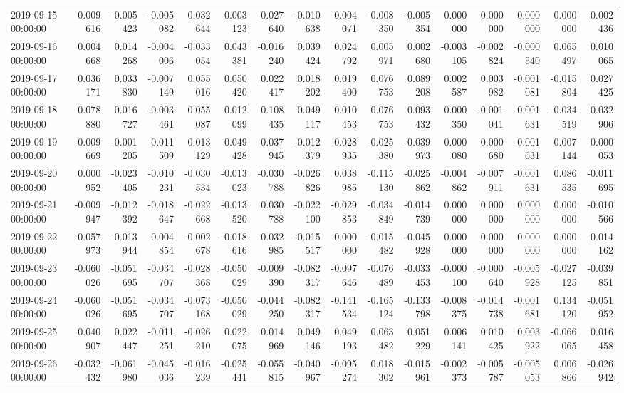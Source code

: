 \begin{tabular}{lrrrrrrrrrrrrrrr}
2019-09-15 00:00:00 & 0.009616 & -0.005423 & -0.005082 & 0.032644 & 0.003123 & 0.027640 & -0.010638 & -0.004071 & -0.008350 & -0.005354 & 0.000000 & 0.000000 & 0.000000 & 0.000000 & 0.002436 \\
2019-09-16 00:00:00 & 0.004668 & 0.014268 & -0.004006 & -0.033054 & 0.043381 & -0.016240 & 0.039424 & 0.024792 & 0.005971 & 0.002680 & -0.003105 & -0.002824 & -0.000540 & 0.065497 & 0.010065 \\
2019-09-17 00:00:00 & 0.036171 & 0.033830 & -0.007149 & 0.055016 & 0.050420 & 0.022417 & 0.018202 & 0.019400 & 0.076753 & 0.089208 & 0.002587 & 0.003982 & -0.001081 & -0.015804 & 0.027425 \\
2019-09-18 00:00:00 & 0.078880 & 0.016727 & -0.003461 & 0.055087 & 0.012099 & 0.108435 & 0.049117 & 0.010453 & 0.076753 & 0.093432 & 0.000350 & -0.001041 & -0.001631 & -0.034519 & 0.032906 \\
2019-09-19 00:00:00 & -0.009669 & -0.001205 & 0.011509 & 0.013129 & 0.049428 & 0.037945 & -0.012379 & -0.028935 & -0.025380 & -0.039973 & 0.000080 & 0.000680 & -0.001631 & 0.007144 & 0.000053 \\
2019-09-20 00:00:00 & 0.000952 & -0.023405 & -0.010231 & -0.030534 & -0.013023 & -0.030788 & -0.026826 & 0.038985 & -0.115130 & -0.025862 & -0.004862 & -0.007911 & -0.001631 & 0.086535 & -0.011695 \\
2019-09-21 00:00:00 & -0.009947 & -0.012392 & -0.018647 & -0.022668 & -0.013520 & 0.030788 & -0.022100 & -0.029853 & -0.034849 & -0.014739 & 0.000000 & 0.000000 & 0.000000 & 0.000000 & -0.010566 \\
2019-09-22 00:00:00 & -0.057973 & -0.013944 & 0.004854 & -0.002678 & -0.018616 & -0.032985 & -0.015517 & 0.000000 & -0.015482 & -0.045928 & 0.000000 & 0.000000 & 0.000000 & 0.000000 & -0.014162 \\
2019-09-23 00:00:00 & -0.060026 & -0.051695 & -0.034707 & -0.028368 & -0.050029 & -0.009390 & -0.082317 & -0.097646 & -0.076489 & -0.033453 & -0.000100 & -0.000640 & -0.005928 & -0.027125 & -0.039851 \\
2019-09-24 00:00:00 & -0.060026 & -0.051695 & -0.034707 & -0.073168 & -0.050029 & -0.044250 & -0.082317 & -0.141534 & -0.165124 & -0.133798 & -0.008375 & -0.014738 & -0.001681 & 0.134120 & -0.051952 \\
2019-09-25 00:00:00 & 0.040907 & 0.022447 & -0.011251 & -0.026210 & 0.022075 & 0.014969 & 0.049146 & 0.049193 & 0.063482 & 0.051229 & 0.006141 & 0.010425 & 0.003922 & -0.066065 & 0.016458 \\
2019-09-26 00:00:00 & -0.032432 & -0.061980 & -0.045036 & -0.016239 & -0.025441 & -0.055815 & -0.040967 & -0.095274 & 0.018302 & -0.015961 & -0.002373 & -0.005787 & -0.005053 & 0.006866 & -0.026942 \\

\end{tabular}
